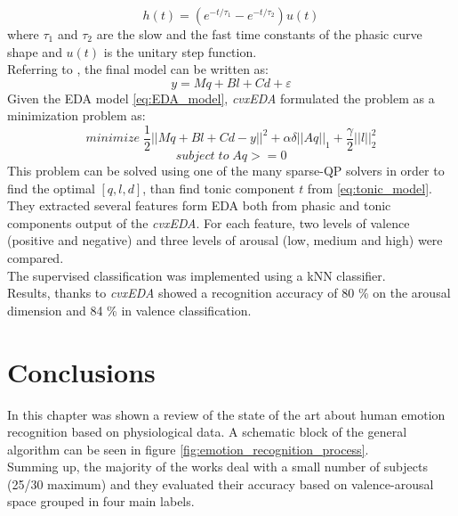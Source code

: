 \begin{equation}
	h(t)=(e^{-t/\tau_1}-e^{-t/\tau_2})u(t)
\end{equation}
where $\tau_1$ and $\tau_2$ are the slow and the fast time constants of the phasic curve shape and $u(t)$ is the unitary step function.
\\
Referring to \cite{greco2016arousal}, the final model can be written as:
\begin{equation}
	\label{eq:EDA_model}
	y=Mq+Bl+Cd+\varepsilon 
\end{equation}
Given the EDA model \ref{eq:EDA_model}, \textit{cvxEDA} formulated the problem as a minimization problem as:
\begin{equation}
	minimize \; \dfrac{1}{2} ||Mq+Bl+Cd-y||^2+\alpha \delta ||Aq||_1+\dfrac{\gamma}{2}||l||^2_2
\end{equation}
\[subject \; to \; Aq>=0 \]
This problem can be solved using one of the many sparse-QP solvers in order to find the optimal $[q,l,d]$, than find tonic component $t$ from \ref{eq:tonic_model}.
\\
They extracted several features form EDA both from phasic and tonic components output of the \textit{cvxEDA}. For each feature, two levels of valence (positive and negative) and three levels of arousal (low, medium and high) were compared.
\\
The supervised classification was implemented using a kNN classifier.
\\ \indent
Results, thanks to \textit{cvxEDA} showed a recognition accuracy of 80 \% on the arousal dimension and 84 \% in valence classification.

\section{Conclusions}
In this chapter was shown a review of the state of the art about human emotion recognition based on physiological data. A schematic block of the general algorithm can be seen in figure \ref{fig:emotion_recognition_process}.
\\
Summing up, the majority of the works deal with a small number of subjects (25/30 maximum) and they evaluated their accuracy based on valence-arousal space grouped in four main labels.




